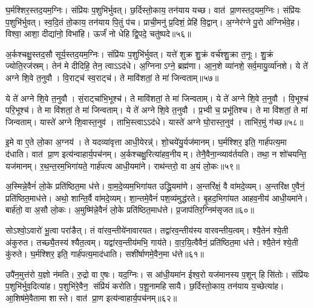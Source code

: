 घ॒र्मश्शिर॒स्तद॒यम॒ग्निः। संप्रि॑यः प॒शुभि॑र्भुवत्। छ॒र्दिस्तो॒काय॒ तन॑याय यच्छ। वात॑ प्रा॒णस्तद॒यम॒ग्निः। संप्रि॑यः प॒शुभि॑र्भुवत्। स्व॒दि॒तं तो॒काय॒ तन॑याय पि॒तुं प॑च। प्राची॒मनु॑ प्र॒दिशं॒ प्रेहि॑ वि॒द्वान्। अ॒ग्नेर॑ग्ने पु॒रो अ॑ग्निर्भवे॒ह। विश्वा॒ आशा॒ दीद्या॑नो॒ विभा॑हि। ऊर्जं॑ नो धेहि द्वि॒पदे॒ चतु॑ष्पदे॥५६॥

अ॒र्कश्चक्षु॒स्तद॒सौ सूर्य॒स्तद॒यम॒ग्निः। संप्रि॑यः प॒शुभि॑र्भुवत्। यत्ते॑ शुक्र शु॒क्रं वर्च॑श्शु॒क्रा त॒नूः। शु॒क्रं ज्योति॒रज॑स्रम्। तेन॑ मे दीदिहि॒ तेन॒ त्वाऽऽद॑धे। अ॒ग्निनाऽग्ने॒ ब्रह्म॑णा। आ॒न॒शे व्या॑नशे॒ सर्व॒मायु॒र्व्या॑नशे। ये ते॑ अग्ने शि॒वे त॒नुवौ। वि॒राट्च॑ स्व॒राट्च॑। ते मावि॑शतां॒ ते मा॑ जिन्वताम्॥५७॥

ये ते॑ अग्ने शि॒वे त॒नुवौ। सं॒राट्चा॑भि॒भूश्च॑। ते मावि॑शतां॒ ते मा॑ जिन्वताम्। ये ते॑ अग्ने शि॒वे त॒नुवौ। वि॒भूश्च॑ परि॒भूश्च॑। ते मा वि॑शतां॒ ते मा॑ जिन्वताम्। ये ते॑ अग्ने शि॒वे त॒नुवौ। प्र॒भ्वी च॒ प्रभू॑तिश्च। ते मा वि॑शतां॒ ते मा॑ जिन्वताम्। यास्ते॑ अग्ने शि॒वास्त॒नुव॑। ताभि॒स्त्वाऽऽद॑धे। यास्ते॑ अग्ने घो॒रास्त॒नुव॑। ताभि॑र॒मुं ग॑च्छ॥५८॥\anuvakamend[चतु॑ष्पदे जिन्वतां त॒नुव॒स्त्रीणि॑ च]

इ॒मे वा ए॒ते लो॒का अ॒ग्नय॑। ते यदव्या॑वृत्ता आधी॒येरन्न्॑। शो॒चये॑यु॒र्यज॑मानम्। घ॒र्मश्शिर॒ इति॒ गार्\mbox{}ह॑पत्य॒मा द॑धाति। वात॑ प्रा॒ण इत्य॑न्वाहार्य॒पच॑नम्। अ॒र्कश्चक्षु॒रित्या॑हव॒नीयम्। तेनै॒वैना॒न्व्याव॑र्तयति। तथा॒ न शो॑चयन्ति॒ यज॑मानम्। र॒थ॒न्त॒रम॒भिगा॑यते॒ गार्\mbox{}ह॑पत्य आधी॒यमा॑ने। राथ॑न्तरो॒ वा अ॒यं लो॒कः॥५९॥

अ॒स्मिन्ने॒वैनं॑ लो॒के प्रति॑ष्ठित॒मा ध॑त्ते। वा॒म॒दे॒व्यम॒भिगा॑यत उद्ध्रि॒यमा॑णे। अ॒न्तरि॑क्षं॒ वै वा॑मदे॒व्यम्। अ॒न्तरि॑क्ष ए॒वैनं॒ प्रति॑ष्ठित॒माध॑त्ते। अथो॒ शान्ति॒र्वै वा॑मदे॒व्यम्। शा॒न्तमे॒वैनं॑ पश॒व्य॑मुद्ध॑रते। बृ॒हद॒भिगा॑यत आहव॒नीय॑ आधी॒यमा॑ने। बार्\mbox{}ह॑तो॒ वा अ॒सौ लो॒कः। अ॒मुष्मि॑न्ने॒वैनं॑ लो॒के प्रति॑ष्ठित॒माध॑त्ते। प्र॒जाप॑तिर॒ग्निम॑सृजत॥६०॥

सोऽश्वो॒ऽवारो॑ भू॒त्वा परा॑ङैत्। तं वा॑रव॒न्तीये॑नावारयत। तद्वा॑रव॒न्तीय॑स्य वारवन्तीय॒त्वम्। श्यै॒तेन॑ श्ये॒ती अ॑कुरुत। तच्छ्यै॒तस्य॑ श्यैत॒त्वम्। यद्वा॑रव॒न्तीय॑मभि॒ गाय॑ते। वा॒र॒यि॒त्वैवैनं॒ प्रति॑ष्ठित॒मा ध॑त्ते। श्यै॒तेन॑ श्ये॒ती कु॑रुते। घ॒र्मश्शिर॒ इति॒ गार्\mbox{}ह॑पत्य॒माद॑धाति। सशी॑र्\mbox{}षाणमे॒वैन॒मा ध॑त्ते॥६१॥

उपै॑न॒मुत्त॑रो य॒ज्ञो न॑मति। रु॒द्रो वा ए॒षः। यद॒ग्निः। स आ॑धी॒यमा॑न ईश्व॒रो यज॑मानस्य प॒शून् हिसि॑तोः। संप्रि॑यः प॒शुभि॑र्भुव॒दित्या॑ह। प॒शुभि॑रे॒वैन॒ संप्रि॑यं करोति। प॒शू॒नामहिसायै। छ॒र्दिस्तो॒काय॒ तन॑याय य॒च्छेत्या॑ह। आ॒शिष॑मे॒वैतामा शास्ते। वात॑ प्रा॒ण इत्य॑न्वाहार्य॒पच॑नम्॥६२॥

